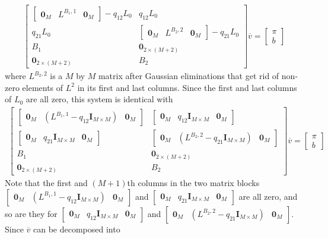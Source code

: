 \documentclass[11pt]{article}
\theoremstyle{definition}
\begin{document}
\begin{align}
\begin{bmatrix}
\begin{bmatrix}
\mathbf{0}_M & {L}^{B_1,1} & \mathbf{0}_M
\end{bmatrix} 
- q_{12} L_0 & q_{12} L_0 \\ 
q_{21}  L_0 & 
\begin{bmatrix}
\mathbf{0}_M & {L}^{B_2,2} & \mathbf{0}_M
\end{bmatrix} 
- q_{21} L_0
\\
B_1 & \mathbf{0}_{2 \times (M+2)} \\
\mathbf{0}_{2 \times (M+2)} & B_2 
\end{bmatrix}
\overline{v}
=
\begin{bmatrix}
\pi \\ 
b
\end{bmatrix}
\end{align}
where $L^{B_2,2}$ is a $M$ by $M$ matrix after Gaussian eliminations that get rid of non-zero elements of $L^{2}$ in its first and last columns. Since the first and last columns of $L_0$ are all zero, this system is identical with 
\begin{align}
\begin{bmatrix}
\begin{bmatrix}
\mathbf{0}_M & ({L}^{B_1,1} - q_{12} \mathbf{I}_{M \times M}) & \mathbf{0}_M
\end{bmatrix} 
& 
\begin{bmatrix}
\mathbf{0}_M & q_{12} \mathbf{I}_{M \times M} & \mathbf{0}_M
\end{bmatrix} 
\\ 
\begin{bmatrix}
\mathbf{0}_M & q_{21} \mathbf{I}_{M \times M} & \mathbf{0}_M
\end{bmatrix} 
& 
\begin{bmatrix}
\mathbf{0}_M & ({L}^{B_2,2} - q_{21} \mathbf{I}_{M \times M}) & \mathbf{0}_M
\end{bmatrix} 
\\
B_1 & \mathbf{0}_{2 \times (M+2)} \\
\mathbf{0}_{2 \times (M+2)} & B_2 
\end{bmatrix}
\overline{v}
=
\begin{bmatrix}
\pi \\ 
b
\end{bmatrix}
\end{align}
Note that the first and $(M+1)$th columns in the two matrix blocks $\begin{bmatrix}
\mathbf{0}_M & ({L}^{B_1,1} - q_{12} \mathbf{I}_{M \times M}) & \mathbf{0}_M
\end{bmatrix} $ and $\begin{bmatrix}
\mathbf{0}_M & q_{21} \mathbf{I}_{M \times M} & \mathbf{0}_M
\end{bmatrix} $ are all zero, and so are they for $\begin{bmatrix}
\mathbf{0}_M & q_{12} \mathbf{I}_{M \times M} & \mathbf{0}_M
\end{bmatrix} $ and $\begin{bmatrix}
\mathbf{0}_M & ({L}^{B_2,2} - q_{21} \mathbf{I}_{M \times M}) & \mathbf{0}_M
\end{bmatrix}$. Since $\overline{v}$ can be decomposed into
\end{document}
